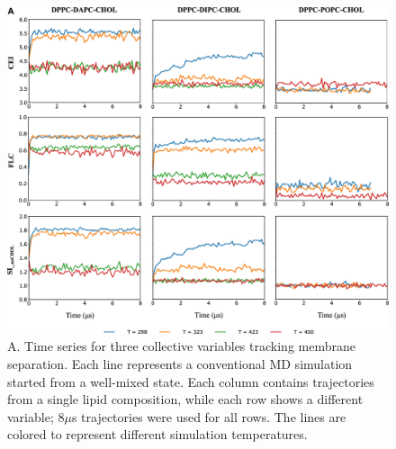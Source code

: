 \documentclass{biophys-new}
\begin{document}
\begin{figure}[hbt!]
\centering
\includegraphics[width=1\linewidth]{Figures/Main/3/placeholder.jpg}
\caption{A. Time series for three collective variables tracking membrane separation. Each line represents a conventional MD simulation started from a well-mixed state. Each column contains trajectories from a single lipid composition, while each row shows a different variable; 8$\mu$s trajectories were used for all rows. The lines are colored to represent different simulation temperatures.}
\label{fig3:view}
\end{figure}
\end{document}
